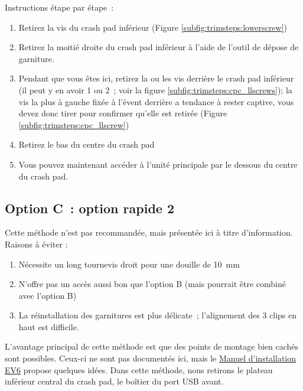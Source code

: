 \documentclass[superscriptaddress,onecolumn,floatfix]{revtex4-2}
\begin{document}
Instructions étape par étape :
\begin{enumerate}
  \item Retirez la vis du crash pad inférieur (Figure \ref{subfig:trimsteps:lowerscrew})
  \item Retirez la moitié droite du crash pad inférieur à l'aide de l'outil de dépose de garniture. 
  \item Pendant que vous êtes ici, retirez la ou les vis derrière le crash pad inférieur (il peut y en avoir 1 ou 2 ; voir la figure \ref{subfig:trimsteps:cpc_llscrews}); la vis la plus à gauche fixée à l'évent derrière a tendance à rester captive, vous devez donc tirer pour confirmer qu'elle est retirée (Figure \ref{subfig:trimsteps:cpc_llscrew})
  \item Retirez le bas du centre du crash pad
  \item Vous pouvez maintenant accéder à l'unité principale par le dessous du centre du crash pad.
\end{enumerate}

\subsection{Option C : option rapide 2}

Cette méthode n'est pas recommandée, mais présentée ici à titre d'information. Raisons à éviter :
\begin{enumerate}
  \item Nécessite un long tournevis droit pour une douille de 10 mm
  \item N'offre pas un accès aussi bon que l'option B (mais pourrait être combiné avec l'option B)
  \item La réinstallation des garnitures est plus délicate ; l'alignement des 3 clips en haut est difficile. 
\end{enumerate}
L’avantage principal de cette méthode est que des points de montage bien cachés sont possibles. Ceux-ci ne sont pas documentés ici, mais le \href{https://github.com/tylerharvey/Ioniq5_CAN/blob/main/guides/cars/E-GMP_gen1/EV6/head_unit_preconditioning_kit_EV6_install.pdf}{Manuel d'installation EV6} propose quelques idées. Dans cette méthode, nous retirons le plateau inférieur central du crash pad, le boîtier du port USB avant. 
\end{document}
